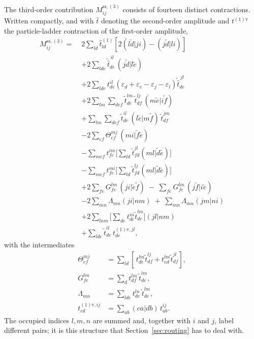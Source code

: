 \documentclass[aip,jcp,amsmath,amssymb,preprint,superscriptaddress]{revtex4-2}%
\newcommand{\pao}[1]{\tilde{#1}}
\begin{document}
The third-order contribution $M^{\text{ss},(3)}_{ij}$ consists of fourteen
distinct contractions. Written compactly, and with $\hat{t}$ denoting the
second-order amplitude and $t^{(1)\text{v}}$ the particle-ladder contraction
of the first-order amplitude,
%
\begin{align}
  M^{\text{ss},(3)}_{ij} =\;
  &2\sum_{ld} \hat{t}^{(1)}_{ld}\left[2(l\pao{d}|ji)-(j\pao{d}|li)\right]
  \tag{T1}\\
  &+2\sum_{lde}\tilde{\hat{t}}^{\,il}_{de}\,(j\pao{d}|l\pao{e})
  \tag{T2}\\
  &+2\sum_{lde} t^{il}_{de}
     \left(\varepsilon_d+\varepsilon_e-\varepsilon_j-\varepsilon_l\right)
     \tilde{\hat{t}}^{\,jl}_{de}
  \tag{T3}\\
  &+2\sum_{lm}\sum_{def}
     \tilde{t}^{lm}_{de}\,\tilde{t}^{lj}_{df}\,(m\pao{e}|i\pao{f})
  \tag{T4}\\
  &+\sum_{lm}\sum_{def}
     \tilde{t}^{il}_{de}\,(l\pao{e}|m\pao{f})\,\tilde{t}^{jm}_{df}
  \tag{T5}\\
  &-2\sum_{ef} \Theta^{mj}_{ef}\,(mi|\pao{f}\pao{e})
  \tag{T6}\\
  &-\sum_{mef} t^{im}_{fe}
     \Big[\textstyle\sum_{ld}\tilde{t}^{jl}_{fd}(ml|\pao{d}\pao{e})\Big]
  \tag{T7}\\
  &-\sum_{mef} t^{mi}_{fe}
     \Big[\textstyle\sum_{ld}\tilde{t}^{lj}_{fd}(ml|\pao{d}\pao{e})\Big]
  \tag{T8}\\
  &+2\sum_{fe} G^{lm}_{fe}\,(ji|\pao{e}\pao{f})
   \;-\;\sum_{fe} G^{lm}_{fe}\,(j\pao{f}|i\pao{e})
  \tag{T9,T10}\\
  &-2\sum_{mn}\Lambda_{mn}(ji|nm)
   \;+\;\sum_{mn}\Lambda_{mn}(jm|ni)
  \tag{T11,T12}\\
  &+2\sum_{lnm}\Big[\textstyle\sum_{de}t^{in}_{de}\tilde{t}^{lm}_{de}\Big](jl|nm)
  \tag{T13}\\
  &+\sum_{lde}\tilde{t}^{il}_{de}\,t^{(1)\text{v},jl}_{de},
  \tag{T14}
\end{align}
%
with the intermediates
%
\begin{align}
  \Theta^{mj}_{ef} &= \sum_{ld}\left[\,t^{lm}_{de}\tilde{t}^{lj}_{df}
                     + t^{lm}_{ed}\tilde{t}^{jl}_{df}\right], \\
  G^{lm}_{fe}      &= \sum_{d} t^{lm}_{df}\,\tilde{t}^{lm}_{de}, \\
  \Lambda_{mn}     &= \sum_{lde} t^{ln}_{de}\,\tilde{t}^{lm}_{de},\\
  t^{(1)\text{v},ij}_{cd} &= \sum_{ab}(ca|db)\,t^{ij}_{ab}.
\end{align}
%
The occupied indices $l,m,n$ are summed and, together with $i$ and $j$, label
different pairs; it is this structure that Section~\ref{sec:routing} has to
deal with.
\end{document}
